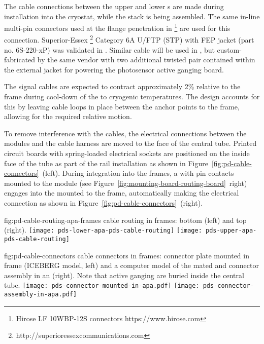 
The cable connections between the upper and lower s are made during  installation into the cryostat, while the  stack is being assembled. The same in-line multi-pin connectors used at the flange penetration in \footnote{Hirose LF 10WBP-12S connectors https://www.hirose.com} are used for this connection.  Superior-Essex \footnote{http://superioressexcommunications.com} Category 6A U/FTP (STP) with FEP jacket (part no. 6S-220-xP) was validated in .  Similar cable will be used in , but custom-fabricated by the same vendor with two additional twisted pair contained within the external jacket for powering the photosensor active ganging board.

The  signal cables are expected to contract approximately 2\% relative to the  frame during cool-down of the  to cryogenic temperatures.  The design accounts for this by leaving cable loops in place between the anchor points to the  frame, allowing for the required relative motion.

To remove interference with the  cables, the electrical connections between the  modules and the  cable harness are moved to the face of the central  tube.  Printed circuit boards with spring-loaded electrical sockets are positioned on the inside face of the tube as part of the  rail installation as shown in Figure~\ref{fig:pd-cable-connectors}~(left).  During  integration into the  frames, a  with pin contacts mounted to the  module (see Figure~\ref{fig:mounting-board-routing-board}~right) engages into the  mounted to the  frame, automatically making the electrical connection as shown in 
Figure~\ref{fig:pd-cable-connectors}~(right).

\begin{dunefigure}
{fig:pd-cable-routing-apa-frames}
{ cable routing in  frames: bottom  (left) and top  (right).}
	\texttt{[image: pds-lower-apa-pds-cable-routing]}
	\texttt{[image: pds-upper-apa-pds-cable-routing]}
	\vspace{-1.5cm}
\end{dunefigure}

\begin{dunefigure}{fig:pd-cable-connectors}
{ cable connectors in  frames:  connector plate mounted in  frame (ICEBERG model, left) and a computer model of the mated  and connector assembly in an  (right).  Note that active ganging  are buried inside the central tube.}
	\texttt{[image: pds-connector-mounted-in-apa.pdf]}
	\texttt{[image: pds-connector-assembly-in-apa.pdf]}
\end{dunefigure}

